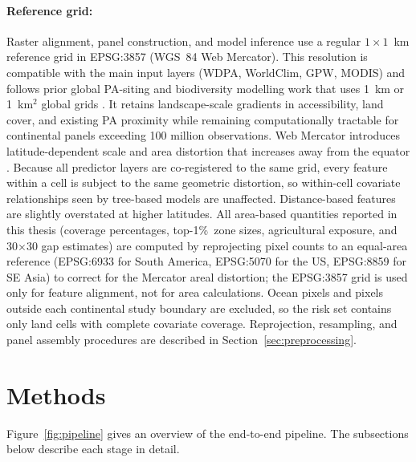 \documentclass[12pt]{article}
\theoremstyle{break}
\begin{document}
\paragraph{Reference grid:}
\label{sec:harmonisation}
Raster alignment, panel construction, and model inference use a regular
$1 \times 1$~km reference grid in EPSG:3857 (WGS~84 Web Mercator). This resolution is
compatible with the main input layers (WDPA, WorldClim, GPW, MODIS) and follows prior
global PA-siting and biodiversity modelling work that uses 1~km or 1~km$^2$ global
grids \citep{joppa2009, tuanmu2015, schuster2023}. It retains landscape-scale
gradients in accessibility, land cover, and existing PA proximity while remaining
computationally tractable for continental panels exceeding 100 million observations.
Web Mercator introduces latitude-dependent scale and area distortion that increases
away from the equator \citep{snyder1987}. Because all predictor layers are
co-registered to the same grid, every
feature within a cell is subject to the same geometric distortion, so within-cell
covariate relationships seen by tree-based models are unaffected.
Distance-based features are slightly overstated at higher
latitudes. All area-based quantities reported in this thesis
(coverage percentages, top-1\%\ zone sizes, agricultural exposure, and 30$\times$30
gap estimates) are computed by reprojecting pixel counts to an equal-area reference
(EPSG:6933 for South America, EPSG:5070 for the US, EPSG:8859 for SE Asia) to correct
for the Mercator areal distortion; the EPSG:3857 grid is used only for feature
alignment, not for area calculations.
Ocean pixels and pixels
outside each continental study boundary are excluded, so the risk set contains only
land cells with complete covariate coverage. Reprojection, resampling, and panel
assembly procedures are described in Section~\ref{sec:preprocessing}.

\section{Methods}
\label{sec:methods}

Figure~\ref{fig:pipeline} gives an overview of the end-to-end pipeline.
The subsections below describe each stage in detail.
\end{document}
